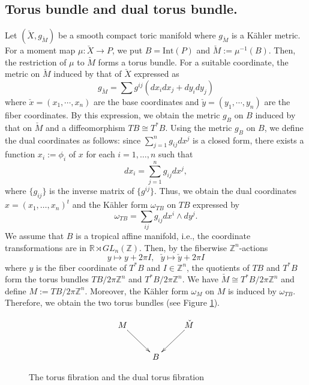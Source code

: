 \documentclass[12pt,reqno]{amsart}
\newcommand{\R}{{\mathbb{R}}}
\newcommand{\Z}{{\mathbb{Z}}}
\newcommand{\Int}{{\mathrm{Int}}}
\theoremstyle{definition}
\begin{document}
\subsection{Torus bundle and dual torus bundle.}\label{MM}
Let $(\check{X},g_{\check{M}})$ be a smooth compact toric manifold where $g_{\check{M}}$ is a K\"ahler metric. For a moment map $\mu:\check{X}\to P$, we put $B=\Int(P)$ and $\check{M}:=\mu^{-1}(B)$. Then, the restriction of $\mu$ to $\check{M}$ forms a torus bundle. For a suitable coordinate, the metric on $\check{M}$ induced by that of $\check{X}$ expressed as
\begin{equation*}
g_{\check{M}} = \sum g^{ij}(dx_idx_j+dy_idy_j)
\end{equation*}
where $\check{x}=(x_1,\cdots,x_n)$ are the base coordinates and $\check{y}=(y_1,\cdots,y_n)$ are the fiber coordinates. By this expression, we obtain the metric $g_B$ on $B$ induced by that on $\check{M}$ and a diffeomorphism $TB\cong T^*B$. 
 Using the metric $g_B$ on $B$, we define the dual coordinates as follows: 
since $\sum_{j=1}^ng_{ij}dx^j$ is a closed form, there exists a function $x_i:=\phi_i$ of $x$ for each $i=1,\dots,n$ such that
\begin{equation*}
dx_i=\sum_{j=1}^ng_{ij}dx^j,
\end{equation*}
where $\{g_{ij}\}$ is the inverse matrix of $\{g^{ij}\}.$ Thus, we obtain the dual coordinates $x=(x_1,\dots,x_n)^t$ and the K\"ahler form $\omega_{TB}$ on $TB$ expressed by
\begin{equation*}
\omega_{TB}=\sum_{ij}g_{ij}dx^i\wedge dy^j. 
\end{equation*}
We assume that $B$ is a tropical affine manifold, i.e., the coordinate transformations are in $\R\rtimes GL_n(\Z)$. Then, by the fiberwise $\Z^n$-actions
\begin{equation*}
y\mapsto y+2\pi I,\ \ \ \check{y}\mapsto \check{y}+2\pi I
\end{equation*}
where $y$ is the fiber coordinate of $T^*B$ and $I\in\Z^n$, the quotients of $TB$ and $T^*B$ form  the torus bundles $TB/2\pi\Z^n$ and $T^*B/2\pi\Z^n$. We have $\check{M}\cong T^*B/2\pi\Z^n$ and define $M:=TB/2\pi\Z^n$. Moreover, the K\"ahler form $\omega_M$ on $M$ is induced by $\omega_{TB}$. Therefore, we obtain the two torus bundles (see Figure \ref{tfdtf}).
\begin{figure}[h]
\begin{equation*}
  \xymatrix{
   M \ar[rd]& & \check{M} \ar[ld] \\
   & B &  \\   
  } 
\end{equation*}
\caption{The torus fibration and the dual torus fibration}
\label{tfdtf}
\end{figure}
\end{document}

